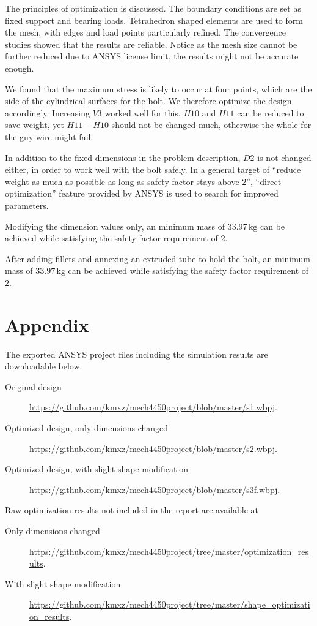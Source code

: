 \documentclass[a4paper,14pt]{extarticle}
\newcommand{\kg}{\,\si{\kilo\gram}}
\begin{document}
The principles of optimization is discussed. The boundary conditions are set as fixed support and bearing loads. Tetrahedron shaped elements are used to form the mesh, with edges and load points particularly refined. The convergence studies showed that the results are reliable. Notice as the mesh size cannot be further reduced due to ANSYS license limit, the results might not be accurate enough.

We found that the maximum stress is likely to occur at four points, which are the side of the cylindrical surfaces for the bolt. We therefore optimize the design accordingly. Increasing $V3$ worked well for this. $H10$ and $H11$ can be reduced to save weight, yet $H11 - H10$ should not be changed much, otherwise the whole for the guy wire might fail.

In addition to the fixed dimensions in the problem description, $D2$ is not changed either, in order to work well with the bolt safely. In a general target of ``reduce weight as much as possible as long as safety factor stays above 2'', ``direct optimization'' feature provided by ANSYS is used to search for improved parameters.

Modifying the dimension values only, an minimum mass of $33.97\kg$ can be achieved while satisfying the safety factor requirement of $2$. 

After adding fillets and annexing an extruded tube to hold the bolt, an minimum mass of $33.97\kg$ can be achieved while satisfying the safety factor requirement of $2$. 
\section{Appendix}
The exported ANSYS project files including the simulation results are downloadable below. 
\begin{description}
\item[Original design] \url{https://github.com/kmxz/mech4450project/blob/master/s1.wbpj}.
\item[Optimized design, only dimensions changed] \url{https://github.com/kmxz/mech4450project/blob/master/s2.wbpj}.
\item[Optimized design, with slight shape modification] \url{https://github.com/kmxz/mech4450project/blob/master/s3f.wbpj}.
\end{description}

Raw optimization results not included in the report are available at
\begin{description}
\item[Only dimensions changed] \url{https://github.com/kmxz/mech4450project/tree/master/optimization_results}.
\item[With slight shape modification] \url{https://github.com/kmxz/mech4450project/tree/master/shape_optimization_results}.
\end{description}
\end{document}

